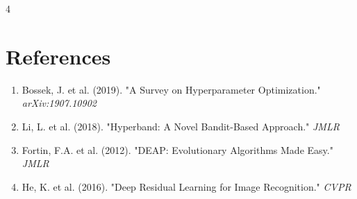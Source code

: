 \documentclass[a0,landscape]{a0poster}
\begin{document}
\begin{multicols*}{4}
\color{Teal}
\section*{References}
\color{Black}
\small
\begin{enumerate}
    \item Bossek, J. et al. (2019). "A Survey on Hyperparameter Optimization." \textit{arXiv:1907.10902}
    \item Li, L. et al. (2018). "Hyperband: A Novel Bandit-Based Approach." \textit{JMLR}
    \item Fortin, F.A. et al. (2012). "DEAP: Evolutionary Algorithms Made Easy." \textit{JMLR}
    \item He, K. et al. (2016). "Deep Residual Learning for Image Recognition." \textit{CVPR}
\end{enumerate}

\color{Teal}
\end{multicols*}
\end{document}
